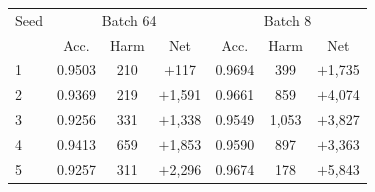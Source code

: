 \footnotesize
\setlength{\tabcolsep}{3pt}
\begin{tabular}{lcccccc}
\toprule
Seed & \multicolumn{3}{c}{Batch 64} & \multicolumn{3}{c}{Batch 8} \\
 & Acc. & Harm & Net & Acc. & Harm & Net \\
\midrule
1 & 0.9503 & 210 & $+$117 & 0.9694 & 399 & $+$1{,}735 \\
2 & 0.9369 & 219 & $+$1{,}591 & 0.9661 & 859 & $+$4{,}074 \\
3 & 0.9256 & 331 & $+$1{,}338 & 0.9549 & 1{,}053 & $+$3{,}827 \\
4 & 0.9413 & 659 & $+$1{,}853 & 0.9590 & 897 & $+$3{,}363 \\
5 & 0.9257 & 311 & $+$2{,}296 & 0.9674 & 178 & $+$5{,}843 \\
\bottomrule
\end{tabular}
